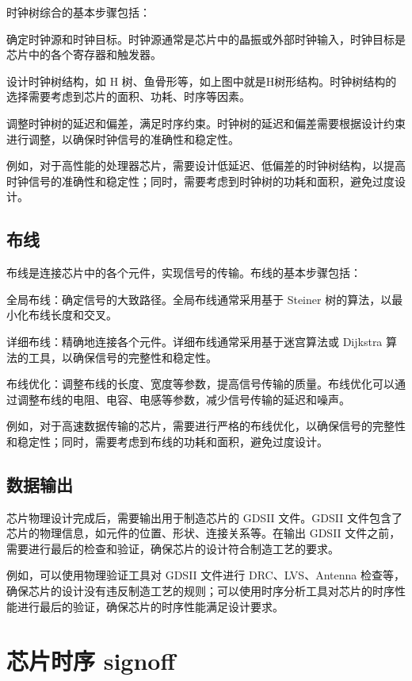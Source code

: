 时钟树综合的基本步骤包括：

确定时钟源和时钟目标。时钟源通常是芯片中的晶振或外部时钟输入，时钟目标是芯片中的各个寄存器和触发器。

设计时钟树结构，如 H 树、鱼骨形等，如上图中就是H树形结构。时钟树结构的选择需要考虑到芯片的面积、功耗、时序等因素。

调整时钟树的延迟和偏差，满足时序约束。时钟树的延迟和偏差需要根据设计约束进行调整，以确保时钟信号的准确性和稳定性。

例如，对于高性能的处理器芯片，需要设计低延迟、低偏差的时钟树结构，以提高时钟信号的准确性和稳定性；同时，需要考虑到时钟树的功耗和面积，避免过度设计。

\subsection{布线}\label{sec:17-chip-backend-008}

布线是连接芯片中的各个元件，实现信号的传输。布线的基本步骤包括：

全局布线：确定信号的大致路径。全局布线通常采用基于 Steiner 树的算法，以最小化布线长度和交叉。

详细布线：精确地连接各个元件。详细布线通常采用基于迷宫算法或 Dijkstra 算法的工具，以确保信号的完整性和稳定性。

布线优化：调整布线的长度、宽度等参数，提高信号传输的质量。布线优化可以通过调整布线的电阻、电容、电感等参数，减少信号传输的延迟和噪声。

例如，对于高速数据传输的芯片，需要进行严格的布线优化，以确保信号的完整性和稳定性；同时，需要考虑到布线的功耗和面积，避免过度设计。

\subsection{数据输出}\label{sec:17-chip-backend-009}

芯片物理设计完成后，需要输出用于制造芯片的 GDSII 文件。GDSII 文件包含了芯片的物理信息，如元件的位置、形状、连接关系等。在输出 GDSII 文件之前，需要进行最后的检查和验证，确保芯片的设计符合制造工艺的要求。

例如，可以使用物理验证工具对 GDSII 文件进行 DRC、LVS、Antenna 检查等，确保芯片的设计没有违反制造工艺的规则；可以使用时序分析工具对芯片的时序性能进行最后的验证，确保芯片的时序性能满足设计要求。

\section{芯片时序 signoff}\label{sec:17-chip-backend-010}

